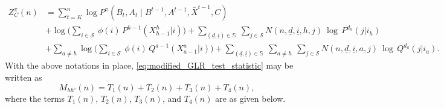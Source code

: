 \begin{align}
	Z^\pi_C(n) 
	& = \sum\limits_{t=K}^{n} \log P^\pi(B_t, A_t\mid B^{t-1}, A^{t-1}, \bar{X}^{t-1}, C)\label{eq:Z^pi_C(n)_5_1}\\
	& + \log \bigg(\sum\limits_{i\in \mathcal{S}}~\phi(i)\, P^{h-1}(X_{h-1}^h|i)\bigg) + \sum\limits_{(\underline{d}, \underline{i}) \in \mathbb{S}}~\sum\limits_{j\in \mathcal{S}} N(n, \underline{d}, \underline{i}, h, j)~\log \, P^{d_h}(j|i_h)\label{eq:Z^pi_C(n)_5_2}\\
	& + \sum\limits_{a\neq h} \log \bigg(\sum\limits_{i\in \mathcal{S}}~\phi(i)\,Q^{a-1}(X_{a-1}^a|i)\bigg) + \sum\limits_{(\underline{d}, \underline{i}) \in \mathbb{S}} ~\sum\limits_{a\neq h}~\sum\limits_{j\in \mathcal{S}} N(n, \underline{d}, \underline{i}, a, j)~\log \, Q^{d_a}(j|i_a).\label{eq:Z^pi_C(n)_5_3}
\end{align}  
With the above notations in place, \eqref{eq:modified_GLR_test_statistic} may be written as
\begin{equation}
	M_{hh'}(n)=T_1(n)+T_2(n)+T_3(n)+T_4(n),
	\label{eq:M_hh'(n)_as_sum_of_4_terms}
\end{equation}
where the terms $T_1(n)$, $T_{2}(n)$, $T_{3}(n)$, and $T_4(n)$ are as given below.
